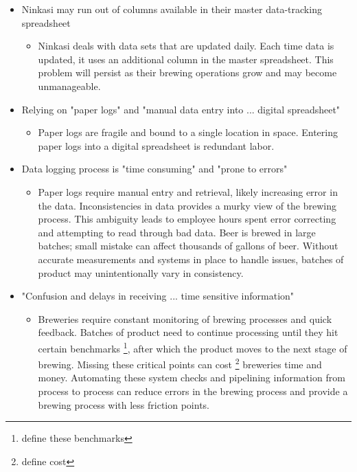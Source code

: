 \documentclass[draftclsnofoot,onecolumn,letterpaper,10pt]{IEEEtran}
\begin{document}
\begin{itemize}

    \item {Ninkasi may run out of columns available in their master data-tracking spreadsheet}
      \begin{itemize}
      \item {Ninkasi deals with data sets that are updated daily. Each time data is updated, it uses an additional column in the master spreadsheet. This problem will persist as their brewing operations grow and may become unmanageable.}
      	\end{itemize}

	\item {Relying on "paper logs" and "manual data entry into ... digital spreadsheet"}
	    \begin{itemize}
			\item {Paper logs are fragile and bound to a single location in space. Entering paper logs into a digital spreadsheet is redundant labor.}
      	    \end{itemize}

	\item {Data logging process is "time consuming" and "prone to errors"}
      		\begin{itemize}
			\item {Paper logs require manual entry and retrieval, likely increasing error in the data. Inconsistencies in data provides a murky view of the brewing process. This ambiguity leads to employee hours spent error correcting and attempting to read through bad data. Beer is brewed in large batches; small mistake can affect thousands of gallons of beer. Without accurate measurements and systems in place to handle issues, batches of product may unintentionally vary in consistency.}
      		\end{itemize}

	\item {"Confusion and delays in receiving ... time sensitive information"}
      		\begin{itemize}
			\item {Breweries require constant monitoring of brewing processes and quick feedback. Batches of product need to continue processing until they hit certain benchmarks \footnote{define these benchmarks}, after which the product moves to the next stage of brewing. Missing these critical points can cost \footnote{define cost} breweries time and money. Automating these system checks and pipelining information from process to process can reduce errors in the brewing process and provide a brewing process with less friction points.
}
      		\end{itemize}


\end{itemize}
\end{document}
